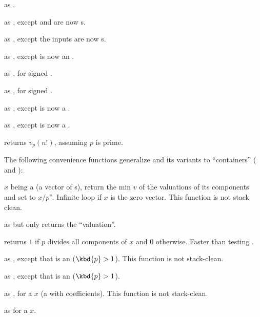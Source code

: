  as
.

 as ,
except  and  are now s.

 as ,
except the inputs are now s.

 as ,
except  is now an .

 as , for signed .

 as , for signed .

 as ,
except  is now a .

 as ,
except  is now a .

 returns $v_p(n!)$, assuming
$p$ is prime.

The following convenience functions generalize  and its variants
to ``containers'' ( and ):


 $x$ being a  (a vector
of s), return the min $v$ of the valuations of its components and
set  to $x/p^v$. Infinite loop if $x$ is the zero vector.
This function is not stack clean.

 as  but only returns the
``valuation''.

 returns $1$ if $p$ divides all components
of $x$ and $0$ otherwise. Faster than testing .

 as ,
except that  is an  ($\kbd{p} > 1$).
This function is not stack-clean.

 as ,
except that  is an  ($\kbd{p} > 1$).


 as , for
a  $x$ (a  with  coefficients).
This function is not stack-clean.

 as  for a  $x$.


